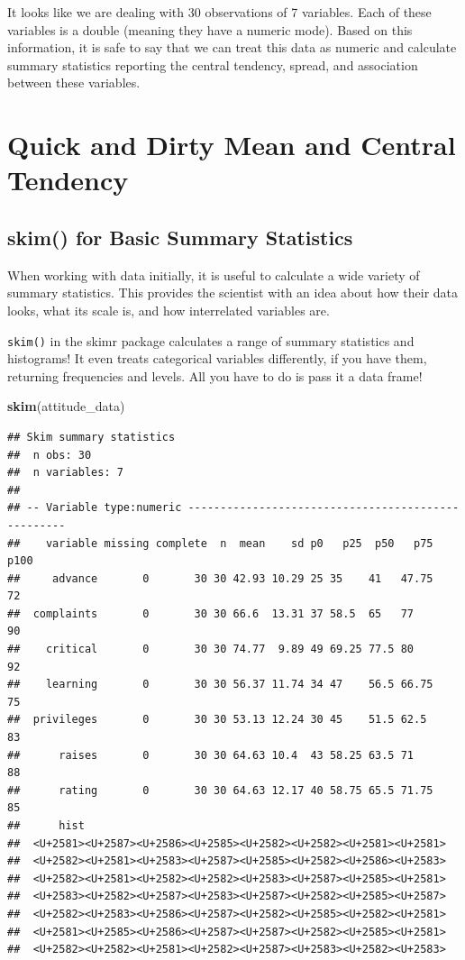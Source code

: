 \documentclass[]{book}
\newenvironment{Shaded}{\begin{snugshade}}{\end{snugshade}}
\newcommand{\KeywordTok}[1]{\textcolor[rgb]{0.13,0.29,0.53}{\textbf{#1}}}
\newcommand{\NormalTok}[1]{#1}
\theoremstyle{definition}
\theoremstyle{definition}
\theoremstyle{definition}
\theoremstyle{remark}
\begin{document}
It looks like we are dealing with 30 observations of 7 variables. Each of these variables is a double (meaning they have a numeric mode). Based on this information, it is safe to say that we can treat this data as numeric and calculate summary statistics reporting the central tendency, spread, and association between these variables.

\hypertarget{quick-and-dirty-mean-and-central-tendency}{%
\section{Quick and Dirty Mean and Central Tendency}\label{quick-and-dirty-mean-and-central-tendency}}

\hypertarget{skim-for-basic-summary-statistics}{%
\subsection{skim() for Basic Summary Statistics}\label{skim-for-basic-summary-statistics}}

When working with data initially, it is useful to calculate a wide variety of summary statistics. This provides the scientist with an idea about how their data looks, what its scale is, and how interrelated variables are.

\texttt{skim()} in the skimr package calculates a range of summary statistics and histograms! It even treats categorical variables differently, if you have them, returning frequencies and levels. All you have to do is pass it a data frame!

\begin{Shaded}
\begin{Highlighting}[]
\KeywordTok{skim}\NormalTok{(attitude_data)}
\end{Highlighting}
\end{Shaded}

\begin{verbatim}
## Skim summary statistics
##  n obs: 30 
##  n variables: 7 
## 
## -- Variable type:numeric ---------------------------------------------------
##    variable missing complete  n  mean    sd p0   p25  p50   p75 p100
##     advance       0       30 30 42.93 10.29 25 35    41   47.75   72
##  complaints       0       30 30 66.6  13.31 37 58.5  65   77      90
##    critical       0       30 30 74.77  9.89 49 69.25 77.5 80      92
##    learning       0       30 30 56.37 11.74 34 47    56.5 66.75   75
##  privileges       0       30 30 53.13 12.24 30 45    51.5 62.5    83
##      raises       0       30 30 64.63 10.4  43 58.25 63.5 71      88
##      rating       0       30 30 64.63 12.17 40 58.75 65.5 71.75   85
##      hist
##  <U+2581><U+2587><U+2586><U+2585><U+2582><U+2582><U+2581><U+2581>
##  <U+2582><U+2581><U+2583><U+2587><U+2585><U+2582><U+2586><U+2583>
##  <U+2582><U+2581><U+2582><U+2582><U+2583><U+2587><U+2585><U+2581>
##  <U+2583><U+2582><U+2587><U+2583><U+2587><U+2582><U+2585><U+2587>
##  <U+2582><U+2583><U+2586><U+2587><U+2582><U+2585><U+2582><U+2581>
##  <U+2581><U+2585><U+2586><U+2587><U+2587><U+2582><U+2585><U+2581>
##  <U+2582><U+2582><U+2581><U+2582><U+2587><U+2583><U+2582><U+2583>
\end{verbatim}
\end{document}
